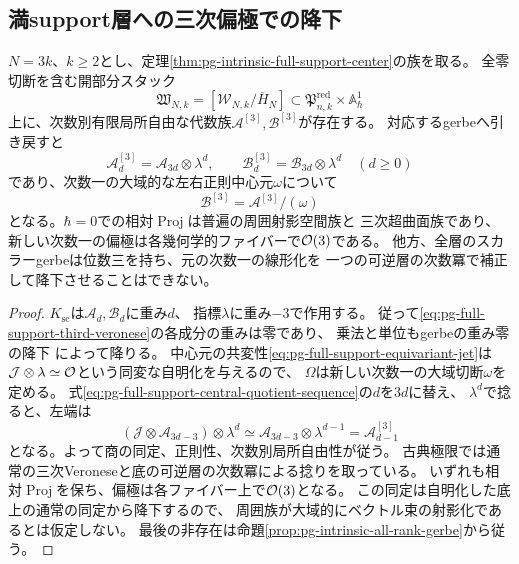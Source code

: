 \subsection{満support層への三次偏極での降下}
\begin{corollary}[満support層の三次Veronese族]
\label{cor:pg-full-support-veronese-descent}
$N=3k$、$k\ge2$とし、定理\ref{thm:pg-intrinsic-full-support-center}の族を取る。
全零切断を含む開部分スタック
\begin{equation}
 \mathfrak W_{N,k}=[\mathcal W_{N,k}/\overline H_N]
 \subset\mathfrak P_{n,k}^{\mathrm{red}}\times\mathbb A^1_\hbar
 \label{eq:pg-full-support-effective-open}
\end{equation}
上に、次数別有限局所自由な代数族$\mathcal A^{[3]},\mathcal B^{[3]}$が存在する。
対応するgerbeへ引き戻すと
\begin{equation}
 \mathcal A^{[3]}_d=\mathcal A_{3d}\otimes\lambda^d,
 \qquad
 \mathcal B^{[3]}_d=\mathcal B_{3d}\otimes\lambda^d
 \quad(d\ge0)
 \label{eq:pg-full-support-third-veronese}
\end{equation}
であり、次数一の大域的な左右正則中心元$\omega$について
\begin{equation}
 \mathcal B^{[3]}=\mathcal A^{[3]}/(\omega)
 \label{eq:pg-full-support-veronese-quotient}
\end{equation}
となる。$\hbar=0$での相対$\operatorname{Proj}$は普遍の周囲射影空間族と
三次超曲面族であり、新しい次数一の偏極は各幾何学的ファイバーで$\mathcal O(3)$である。
他方、全層のスカラーgerbeは位数三を持ち、元の次数一の線形化を
一つの可逆層の次数冪で補正して降下させることはできない。
\end{corollary}
\begin{proof}
$K_{\mathrm{sc}}$は$\mathcal A_d,\mathcal B_d$に重み$d$、
指標$\lambda$に重み$-3$で作用する。
従って\eqref{eq:pg-full-support-third-veronese}の各成分の重みは零であり、
乗法と単位もgerbeの重み零の降下
\cite[Proposition~4.10]{PBerghSchnurerGerbes}によって降りる。
中心元の共変性\eqref{eq:pg-full-support-equivariant-jet}は
$\mathcal J\otimes\lambda\simeq\mathcal O$という同変な自明化を与えるので、
$\Omega$は新しい次数一の大域切断$\omega$を定める。
式\eqref{eq:pg-full-support-central-quotient-sequence}の$d$を$3d$に替え、
$\lambda^d$で捻ると、左端は
\begin{equation}
 (\mathcal J\otimes\mathcal A_{3d-3})\otimes\lambda^d
   \simeq\mathcal A_{3d-3}\otimes\lambda^{d-1}
   =\mathcal A^{[3]}_{d-1}
 \label{eq:pg-full-support-veronese-exact-sequence}
\end{equation}
となる。よって商の同定、正則性、次数別局所自由性が従う。
古典極限では通常の三次Veroneseと底の可逆層の次数冪による捻りを取っている。
いずれも相対$\operatorname{Proj}$を保ち、偏極は各ファイバー上で$\mathcal O(3)$となる。
この同定は自明化した底上の通常の同定から降下するので、
周囲族が大域的にベクトル束の射影化であるとは仮定しない。
最後の非存在は命題\ref{prop:pg-intrinsic-all-rank-gerbe}から従う。
\end{proof}

